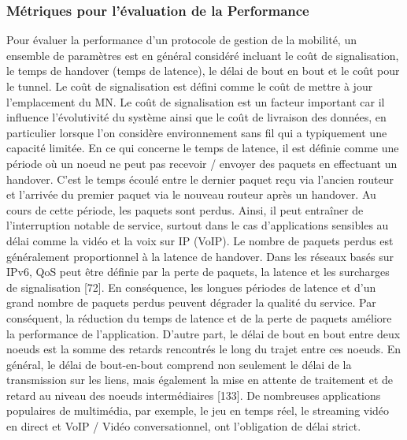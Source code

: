\subsubsection{Métriques pour l'évaluation de la Performance}
Pour évaluer la performance d'un protocole de gestion de la mobilité, un ensemble de paramètres est en général considéré incluant le coût de signalisation, le temps de handover (temps de latence), le délai de bout en bout et le coût pour le tunnel. Le coût de signalisation est défini comme le coût de mettre à jour l'emplacement du MN.  Le coût  de signalisation est un facteur important car il influence l'évolutivité du système ainsi que le coût de livraison des données, en particulier lorsque l'on considère environnement sans fil qui a typiquement une capacité limitée. En ce qui concerne le temps de latence, il est définie comme une période où un noeud ne peut pas recevoir / envoyer des paquets en effectuant un handover. C'est le temps écoulé entre le dernier paquet reçu via l'ancien routeur et l'arrivée du premier paquet via le nouveau routeur après un handover. Au cours de cette période, les paquets sont perdus. Ainsi, il peut entraîner de l'interruption notable de service, surtout dans le cas d'applications sensibles au délai comme la vidéo et la voix sur IP (VoIP). Le nombre de paquets perdus est généralement proportionnel à la latence de handover. Dans les réseaux basés sur IPv6, QoS peut être définie par la perte de paquets, la latence et les surcharges de signalisation [72]. En conséquence, les longues périodes de latence et d'un grand nombre de paquets perdus peuvent dégrader la qualité du service. Par conséquent, la réduction du temps de latence et de la perte de paquets améliore la performance de l'application. D'autre part, le délai de bout en bout entre deux noeuds est la somme des retards rencontrés le long du trajet entre ces noeuds. En général, le délai de bout-en-bout comprend non seulement le délai de la transmission sur les liens, mais également la mise en attente de traitement et de retard au niveau des noeuds intermédiaires [133]. De nombreuses applications populaires de multimédia, par exemple, le jeu en temps réel, le streaming vidéo en direct et VoIP / Vidéo conversationnel, ont l'obligation de délai strict.

